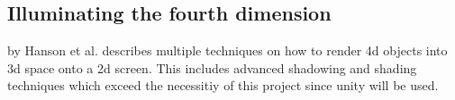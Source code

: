 \documentclass{article}
\begin{document}
\subsection{Illuminating the fourth dimension} by Hanson et al. \cite{4d_vis_3} describes multiple techniques on how to render 4d objects into 3d space onto a 2d screen. This includes advanced shadowing and shading techniques which exceed the necessitiy of this project since unity will be used.




\end{document}

